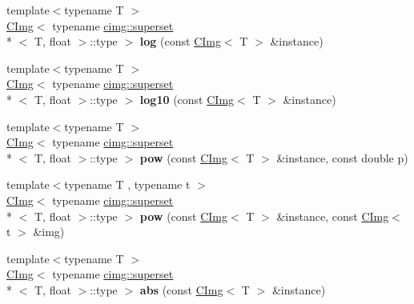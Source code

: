 \begin{DoxyCompactItemize}
\item 
\hypertarget{namespacecimg__library_a82fbcbee9136f5f61397a8b786c4f808}{{\footnotesize template$<$typename T $>$ }\\\hyperlink{structcimg__library_1_1_c_img}{C\-Img}$<$ typename \hyperlink{structcimg__library_1_1cimg_1_1superset}{cimg\-::superset}\\*
$<$ T, float $>$\-::type $>$ {\bfseries log} (const \hyperlink{structcimg__library_1_1_c_img}{C\-Img}$<$ T $>$ \&instance)}\label{namespacecimg__library_a82fbcbee9136f5f61397a8b786c4f808}

\item 
\hypertarget{namespacecimg__library_af9dc7949eaaae362ab4a3815a9524214}{{\footnotesize template$<$typename T $>$ }\\\hyperlink{structcimg__library_1_1_c_img}{C\-Img}$<$ typename \hyperlink{structcimg__library_1_1cimg_1_1superset}{cimg\-::superset}\\*
$<$ T, float $>$\-::type $>$ {\bfseries log10} (const \hyperlink{structcimg__library_1_1_c_img}{C\-Img}$<$ T $>$ \&instance)}\label{namespacecimg__library_af9dc7949eaaae362ab4a3815a9524214}

\item 
\hypertarget{namespacecimg__library_a289e639cde84ea1c5705760b028fdd88}{{\footnotesize template$<$typename T $>$ }\\\hyperlink{structcimg__library_1_1_c_img}{C\-Img}$<$ typename \hyperlink{structcimg__library_1_1cimg_1_1superset}{cimg\-::superset}\\*
$<$ T, float $>$\-::type $>$ {\bfseries pow} (const \hyperlink{structcimg__library_1_1_c_img}{C\-Img}$<$ T $>$ \&instance, const double p)}\label{namespacecimg__library_a289e639cde84ea1c5705760b028fdd88}

\item 
\hypertarget{namespacecimg__library_a3f70742dec1ac3f6991443532070c1ce}{{\footnotesize template$<$typename T , typename t $>$ }\\\hyperlink{structcimg__library_1_1_c_img}{C\-Img}$<$ typename \hyperlink{structcimg__library_1_1cimg_1_1superset}{cimg\-::superset}\\*
$<$ T, float $>$\-::type $>$ {\bfseries pow} (const \hyperlink{structcimg__library_1_1_c_img}{C\-Img}$<$ T $>$ \&instance, const \hyperlink{structcimg__library_1_1_c_img}{C\-Img}$<$ t $>$ \&img)}\label{namespacecimg__library_a3f70742dec1ac3f6991443532070c1ce}

\item 
\hypertarget{namespacecimg__library_a9c51a9e3bff53717ef3b7656208a63fe}{{\footnotesize template$<$typename T $>$ }\\\hyperlink{structcimg__library_1_1_c_img}{C\-Img}$<$ typename \hyperlink{structcimg__library_1_1cimg_1_1superset}{cimg\-::superset}\\*
$<$ T, float $>$\-::type $>$ {\bfseries abs} (const \hyperlink{structcimg__library_1_1_c_img}{C\-Img}$<$ T $>$ \&instance)}\label{namespacecimg__library_a9c51a9e3bff53717ef3b7656208a63fe}


\end{DoxyCompactItemize}
